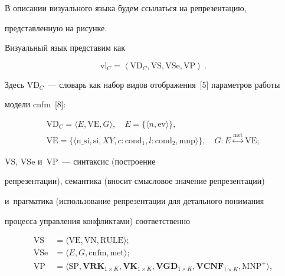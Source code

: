 


  В описании визуального языка будем ссылаться на репрезентацию, 

представленную на рисунке.





  

  Визуальный язык представим как

  \begin{equation}

  \mathrm{vl}_C= \left\langle \mathrm{VD}_C, \mathrm{VS}, \mathrm{VSe}, \mathrm{VP}\right\rangle\,.

  \label{e1-r}

  \end{equation}

Здесь $\mathrm{VD}_C$~--- словарь как набор видов отображения~[5] параметров работы 

модели cnfm~[8]:

\begin{multline*}

\mathrm{VD}_C=\langle E, \mathrm{VE}, G\rangle,\quad E=\{ \langle n, \mathrm{ev}\rangle\},\\

 \mathrm{VE}= \{ \langle \mathrm{n\_si}, \mathrm{si},  XY, c: \mathrm{cond}_1, l: \mathrm{cond}_2, \mathrm{mnp}\rangle\},

\quad

G: E \overset{\mathrm{met}}{\leftrightarrow} \mathrm{VE};

\end{multline*}

$\mathrm{VS}$, $\mathrm{VSe}$ и~$\mathrm{VP}$~--- синтаксис (построение 

репрезентации), семантика (вносит смысловое значение репрезентации) 

и~прагматика (использование репрезентации для детального понимания 

процесса управления конфликтами) соответственно



\vspace*{-2pt}



\noindent

\begin{align*}

\mathrm{VS}&= \langle \mathrm{VE}, \mathrm{VN}, \mathrm{RULE}\rangle;\\ 

\mathrm{VSe}&=\langle E, G, \mathrm{cnfm}, \mathrm{met}\rangle;\\

\mathrm{VP}&=\langle \mathrm{SP}, \mathbf{VRK}_{1\times K}, \mathbf{VK}_{1\times K}, 

\mathbf{VGD}_{1\times K}, \mathbf{VCNF}_{1\times K}, \mathrm{MNP}^+\rangle,

\end{align*}



